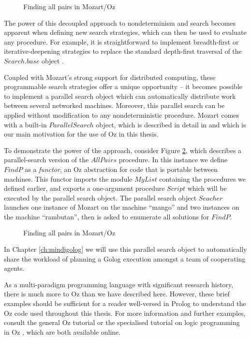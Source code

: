 %
\begin{figure}[t]

\caption{Finding all pairs in Mozart/Oz\label{fig:Background:All-Pairs}}

\end{figure}


The power of this decoupled approach to nondeterminism and search
becomes apparent when defining new search strategies, which can then
be used to evaluate any procedure. For example, it is straightforward
to implement breadth-first or iterative-deepening strategies to replace
the standard depth-first traversal of the $Search.base$ object \citep{schulte00constraint_services}.

Coupled with Mozart's strong support for distributed computing, these
programmable search strategies offer a unique opportunity -- it becomes
possible to implement a parallel search object which can automatically
distribute work between several networked machines. Moreover, this
parallel search can be applied without modification to any nondeterministic
procedure. Mozart comes with a built-in $ParallelSearch$ object,
which is described in detail in \citep{schulte00oz_parallel} and
which is our main motivation for the use of Oz in this thesis.

To demonstrate the power of the approach, consider Figure \ref{fig:Background:Parallel-All-Pairs},
which describes a parallel-search version of the $AllPairs$ procedure.
In this instance we define $FindP$ as a \emph{functor}, an Oz abstraction
for code that is portable between machines. This functor imports the
module $MyList$ containing the procedures we defined earlier, and
exports a one-argument procedure $Script$ which will be executed
by the parallel search object. The parallel search object $Seacher$
launches one instance of Mozart on the machine {}``mango'' and two
instances on the machine {}``rambutan'', then is asked to enumerate
all solutions for $FindP$.

%
\begin{figure}[t]

\caption{Finding all pairs in Mozart/Oz\label{fig:Background:Parallel-All-Pairs}}

\end{figure}


In Chapter \ref{ch:mindigolog} we will use this parallel search object
to automatically share the workload of planning a Golog execution
amongst a team of cooperating agents.

As a multi-paradigm programming language with significant research
history, there is much more to Oz than we have described here. However,
these brief examples should be sufficient for a reader well-versed
in Prolog to understand the Oz code used throughout this thesis. For
more information and further examples, consult the general Oz tutorial
\citep{haridi99oz_tutorial} or the specialised tutorial on logic
programming in Oz \citep{lpinoz99}, which are both available online.

